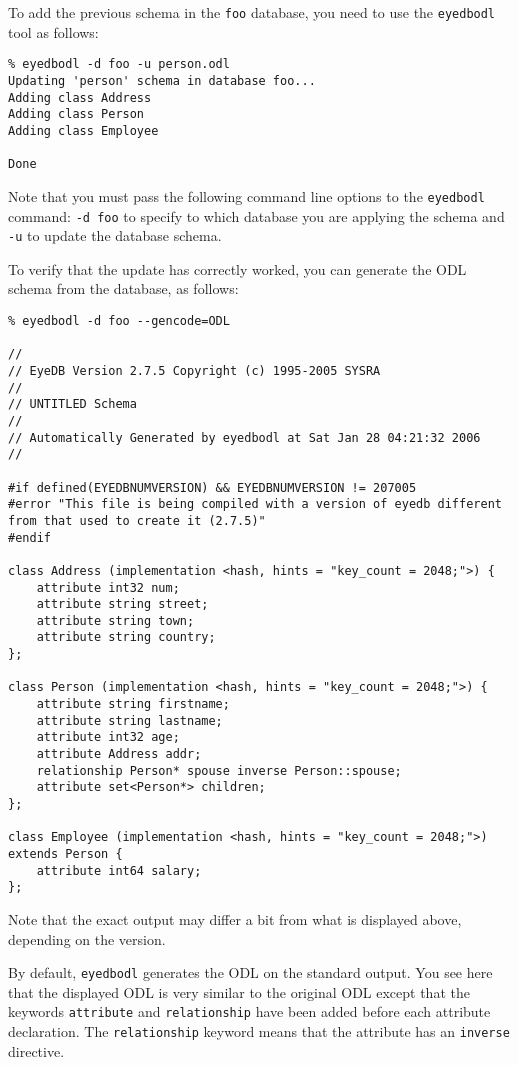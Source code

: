 To add the previous schema in the \texttt{foo} database, you need to
use the \texttt{eyedbodl} tool as follows:
\verbsize \begin{verbatim}
% eyedbodl -d foo -u person.odl
Updating 'person' schema in database foo...
Adding class Address
Adding class Person
Adding class Employee

Done
\end{verbatim}
\normalsize
Note that you must pass the following command line options to the \texttt{eyedbodl} command: \texttt{-d foo} to specify to which database you are applying the schema and \texttt{-u} to update the database schema.

To verify that the update has correctly worked, you can generate
the ODL schema from the database, as follows:
\verbsize \begin{verbatim}
% eyedbodl -d foo --gencode=ODL

//
// EyeDB Version 2.7.5 Copyright (c) 1995-2005 SYSRA
//
// UNTITLED Schema
//
// Automatically Generated by eyedbodl at Sat Jan 28 04:21:32 2006
//

#if defined(EYEDBNUMVERSION) && EYEDBNUMVERSION != 207005
#error "This file is being compiled with a version of eyedb different from that used to create it (2.7.5)"
#endif

class Address (implementation <hash, hints = "key_count = 2048;">) {
	attribute int32 num;
	attribute string street;
	attribute string town;
	attribute string country;
};

class Person (implementation <hash, hints = "key_count = 2048;">) {
	attribute string firstname;
	attribute string lastname;
	attribute int32 age;
	attribute Address addr;
	relationship Person* spouse inverse Person::spouse;
	attribute set<Person*> children;
};

class Employee (implementation <hash, hints = "key_count = 2048;">) extends Person {
	attribute int64 salary;
};
\end{verbatim}
\normalsize

Note that the exact output may differ a bit from what is displayed above, depending on the \eyedb version.

By default, \texttt{eyedbodl} generates the ODL on the standard output.
You see here that the displayed ODL is very similar to the original ODL except
that the keywords \texttt{attribute} and \texttt{relationship} have been added
before each attribute declaration.
The \texttt{relationship} keyword means that the attribute has an \texttt{inverse}
directive.

